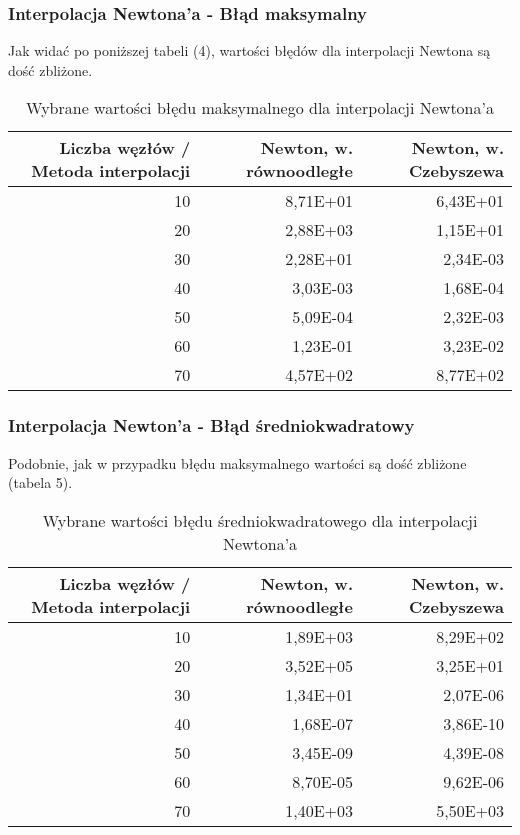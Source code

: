 \documentclass{article}
\begin{document}
\subsubsection{Interpolacja Newtona'a - Błąd maksymalny}

Jak widać po poniższej tabeli (4), wartości błędów dla interpolacji Newtona są dość zbliżone.

\begin{table}[H]
    \centering
    \begin{tabular}{|r|r|r|}
    \hline
        Liczba węzłów / Metoda interpolacji  & Newton, w. równoodległe & Newton, w. Czebyszewa  \\ \hline
        10  & 8,71E+01 & 6,43E+01  \\ \hline
        20  & 2,88E+03 & 1,15E+01  \\ \hline
        30  & 2,28E+01 & 2,34E-03  \\ \hline
        40  & 3,03E-03 & 1,68E-04  \\ \hline
        50  & 5,09E-04 & 2,32E-03  \\ \hline
        60  & 1,23E-01 & 3,23E-02  \\ \hline
        70 & 4,57E+02 & 8,77E+02 \\ \hline
    \end{tabular}
    \caption{Wybrane wartości błędu maksymalnego dla interpolacji Newtona'a}
\end{table}

\subsubsection{Interpolacja Newton'a - Błąd średniokwadratowy}

Podobnie, jak w przypadku błędu maksymalnego wartości są dość zbliżone (tabela 5).

\begin{table}[H]
    \centering
    \begin{tabular}{|r|r|r|}
    \hline
        Liczba węzłów / Metoda interpolacji & Newton, w. równoodległe & Newton, w. Czebyszewa  \\ \hline
        10 & 1,89E+03 & 8,29E+02  \\ \hline
        20 & 3,52E+05 & 3,25E+01  \\ \hline
        30 & 1,34E+01 & 2,07E-06  \\ \hline
        40 & 1,68E-07 & 3,86E-10  \\ \hline
        50 & 3,45E-09 & 4,39E-08  \\ \hline
        60 & 8,70E-05 & 9,62E-06  \\ \hline
        70 & 1,40E+03 & 5,50E+03 \\ \hline
    \end{tabular}
    \caption{Wybrane wartości błędu średniokwadratowego dla interpolacji Newtona'a}
\end{table}
\end{document}
